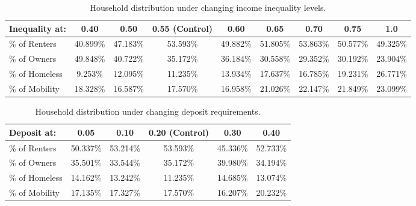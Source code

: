 \documentclass[11pt]{article}
\begin{document}


\begin{table}[!ht]
  \centering
\small
\begin{tabular}{lcccccccc}
    \toprule
    Inequality at: & 0.40 & 0.50 & 0.55 (Control) & 0.60 & 0.65 & 0.70 & 0.75 & 1.0 \\
    \midrule
    \% of Renters   & 40.899\% & 47.183\% & 53.593\% & 49.882\% & 51.805\% & 53.863\% & 50.577\% & 49.325\% \\
    \% of Owners    & 49.848\% & 40.722\% & 35.172\% & 36.184\% & 30.558\% & 29.352\% & 30.192\% & 23.904\% \\
    \% of Homeless  & 9.253\%  & 12.095\% & 11.235\% & 13.934\% & 17.637\% & 16.785\% & 19.231\% & 26.771\% \\
    \midrule
    \% of Mobility  & 18.328\% & 16.587\% & 17.570\% & 16.958\% & 21.026\% & 22.147\% & 21.849\% & 23.099\% \\
    \bottomrule
\end{tabular}
\caption{Household distribution under changing income inequality levels.}
\label{tab:inequality}
\end{table}

\begin{table}[!ht]
  \centering
  \begin{tabular}{lccccc}
    \toprule
    Deposit at: & 0.05 & 0.10 & 0.20 (Control) & 0.30 & 0.40 \\
    \midrule
    \% of Renters   & 50.337\% & 53.214\% & 53.593\% & 45.336\% & 52.733\% \\
    \% of Owners    & 35.501\% & 33.544\% & 35.172\% & 39.980\% & 34.194\% \\
    \% of Homeless  & 14.162\% & 13.242\% & 11.235\% & 14.685\% & 13.074\% \\
    \midrule
    \% of Mobility  & 17.135\% & 17.327\% & 17.570\% & 16.207\% & 20.232\% \\
    \bottomrule
\end{tabular}
\caption{Household distribution under changing deposit requirements.}
\label{tab:deposit}
\end{table}
\end{document}

